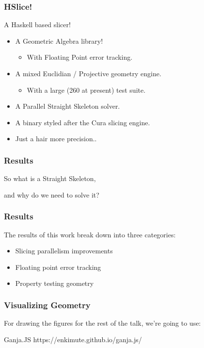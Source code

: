 \documentclass[hyperref={pdfpagemode=FullScreen},aspectratio=169]{beamer}
\begin{document}
\begin{frame}
  \frametitle{HSlice!}
  A Haskell based slicer!
  \begin{itemize}
    \item A Geometric Algebra library!
      \begin{itemize}
      \item With Floating Point error tracking.
      \end{itemize}
    \item A mixed Euclidian / Projective geometry engine.
      \begin{itemize}
      \item With a large (260 at present) test suite.
      \end{itemize}
    \item A Parallel Straight Skeleton solver.
    \item A binary styled after the Cura slicing engine.
    \item Just a hair more precision..
  \end{itemize}
\end{frame}

\begin{frame}
  \frametitle{Results}
  \Huge{\centerline{So what is a Straight Skeleton,}}\par
  \Huge{\centerline{and why do we need to solve it?}}
\end{frame}

\begin{frame}
  \frametitle{Results}
  The results of this work break down into three categories:
  \begin{itemize}
  \item Slicing parallelism improvements
  \item Floating point error tracking
  \item Property testing geometry
  \end{itemize}
\end{frame}

\begin{frame}
  \frametitle{Visualizing Geometry}
  For drawing the figures for the rest of the talk, we're going to use:
  \begin{block}{Ganja.JS}
    https://enkimute.github.io/ganja.js/
  \end{block}
\end{frame}
\end{document}

